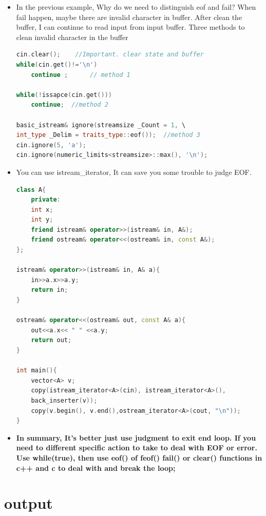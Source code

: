 \documentclass[a4paper,12pt,twoside]{book}
\begin{document}
\begin{itemize}
	\item In the previous example, Why do we need to distinguish eof and fail? When fail happen, maybe there are invalid character in buffer. After clean the buffer, I can continue to read input from input buffer. Three methods to clean invalid character in the buffer
\begin{lstlisting}[frame=single, language=c++]
cin.clear();    //Important. clear state and buffer
while(cin.get()!='\n')
	continue ;      // method 1
	
while(!issapce(cin.get()))
	continue;  //method 2
	
basic_istream& ignore(streamsize _Count = 1, \
int_type _Delim = traits_type::eof());  //method 3
cin.ignore(5, 'a');
cin.ignore(numeric_limits<streamsize>::max(), '\n');
\end{lstlisting}
	
	\item You can use istream\_iterator, It can save you some trouble to judge EOF.
	
\begin{lstlisting}[frame=single, language=c++]
class A{
	private:
	int x;
	int y;
	friend istream& operator>>(istream& in, A&);
	friend ostream& operator<<(ostream& in, const A&);
};
	
istream& operator>>(istream& in, A& a){
	in>>a.x>>a.y;
	return in;
}

ostream& operator<<(ostream& out, const A& a){
	out<<a.x<< " " <<a.y;
	return out;
}
	
int main(){
	vector<A> v;
	copy(istream_iterator<A>(cin), istream_iterator<A>(),
	back_inserter(v));
	copy(v.begin(), v.end(),ostream_iterator<A>(cout, "\n"));
}
\end{lstlisting}
	
	
	\item \textbf{In summary, It's better just use judgment to exit end loop.  If you need to different specific action to take to deal with EOF or error. Use while(true), then use eof() of feof() fail() or clear() functions in c++ and c to deal with and break the loop; }
\end{itemize}

\section{output}
\end{document}
